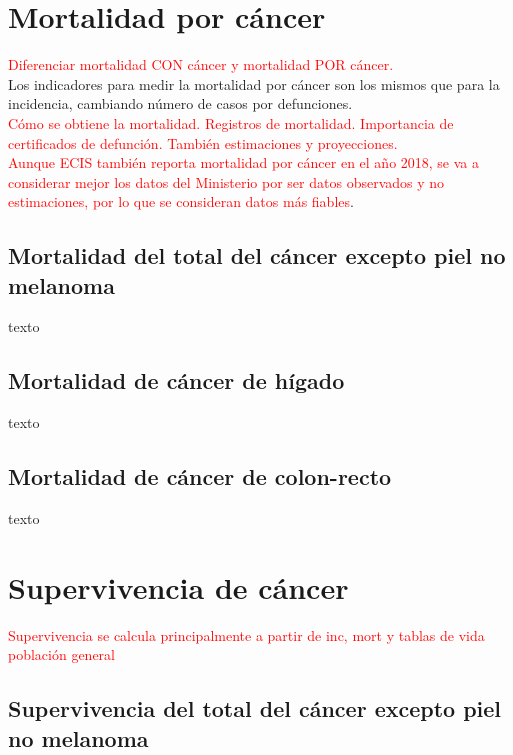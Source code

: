\section{Mortalidad por cáncer}

\textcolor{red}{Diferenciar mortalidad CON cáncer y mortalidad POR cáncer.}\\

Los indicadores para medir la mortalidad por cáncer son los mismos que para la incidencia, cambiando número de casos por defunciones.\\

\textcolor{red}{Cómo se obtiene la mortalidad. Registros de mortalidad. Importancia de certificados de defunción. También estimaciones y proyecciones.}\\

\textcolor{red}{Aunque ECIS también reporta mortalidad por cáncer en el año 2018, se va a considerar mejor los datos del Ministerio por ser datos observados y no estimaciones, por lo que se consideran datos más fiables}.

\subsection{Mortalidad del total del cáncer excepto piel no melanoma}

texto

\subsection{Mortalidad de cáncer de hígado}

texto

\subsection{Mortalidad de cáncer de colon-recto}

texto

\section{Supervivencia de cáncer} 

\textcolor{red}{Supervivencia se calcula principalmente a partir de inc, mort y tablas de vida población general}

\subsection{Supervivencia del total del cáncer excepto piel no melanoma}

